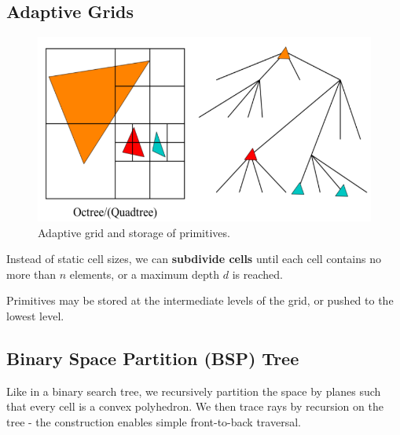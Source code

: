 \documentclass[11pt]{article}
\begin{document}
\subsection{Adaptive Grids}
\begin{figure}[htb!]
  \centering
  \caption{Adaptive grid and storage of primitives.}
  \includegraphics[scale=0.5]{adaptivegrid}
\end{figure}
Instead of static cell sizes, we can \textbf{subdivide cells} until each cell contains no more than $n$ elements, or a maximum depth $d$ is reached.

Primitives may be stored at the intermediate levels of the grid, or pushed to the lowest level.

\subsection{Binary Space Partition (BSP) Tree}
Like in a binary search tree, we recursively partition the space by planes such that every cell is a convex polyhedron.
We then trace rays by recursion on the tree - the construction enables simple front-to-back traversal.
\end{document}
